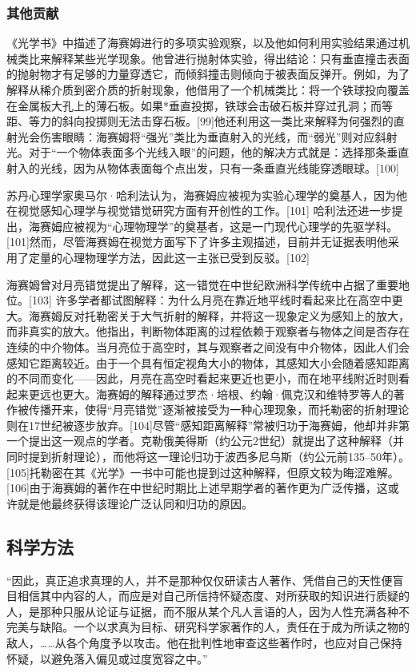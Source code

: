 \subsubsection{其他贡献}
《光学书》中描述了海赛姆进行的多项实验观察，以及他如何利用实验结果通过机械类比来解释某些光学现象。他曾进行抛射体实验，得出结论：只有垂直撞击表面的抛射物才有足够的力量穿透它，而倾斜撞击则倾向于被表面反弹开。例如，为了解释从稀介质到密介质的折射现象，他借用了一个机械类比：将一个铁球投向覆盖在金属板大孔上的薄石板。如果*垂直投掷，铁球会击破石板并穿过孔洞；而等距、等力的斜向投掷则无法击穿石板。[99]他还利用这一类比来解释为何强烈的直射光会伤害眼睛：海赛姆将“强光”类比为垂直射入的光线，而“弱光”则对应斜射光。对于“一个物体表面多个光线入眼”的问题，他的解决方式就是：选择那条垂直射入的光线，因为从物体表面每个点出发，只有一条垂直光线能穿透眼球。[100]

苏丹心理学家奥马尔·哈利法认为，海赛姆应被视为实验心理学的奠基人，因为他在视觉感知心理学与视觉错觉研究方面有开创性的工作。[101]
哈利法还进一步提出，海赛姆应被视为“心理物理学”的奠基者，这是一门现代心理学的先驱学科。[101]然而，尽管海赛姆在视觉方面写下了许多主观描述，目前并无证据表明他采用了定量的心理物理学方法，因此这一主张已受到反驳。[102]

海赛姆曾对月亮错觉提出了解释，这一错觉在中世纪欧洲科学传统中占据了重要地位。[103]
许多学者都试图解释：为什么月亮在靠近地平线时看起来比在高空中更大。海赛姆反对托勒密关于大气折射的解释，并将这一现象定义为感知上的放大，而非真实的放大。他指出，判断物体距离的过程依赖于观察者与物体之间是否存在连续的中介物体。当月亮位于高空时，其与观察者之间没有中介物体，因此人们会感知它距离较近。由于一个具有恒定视角大小的物体，其感知大小会随着感知距离的不同而变化——因此，月亮在高空时看起来更近也更小，而在地平线附近时则看起来更远也更大。海赛姆的解释通过罗杰·培根、约翰·佩克汉和维特罗等人的著作被传播开来，使得“月亮错觉”逐渐被接受为一种心理现象，而托勒密的折射理论则在17世纪被逐步放弃。[104]尽管“感知距离解释”常被归功于海赛姆，他却并非第一个提出这一观点的学者。克勒俄美得斯（约公元2世纪）就提出了这种解释（并同时提到折射理论），而他将这一理论归功于波西多尼乌斯（约公元前135–50年）。[105]托勒密在其《光学》一书中可能也提到过这种解释，但原文较为晦涩难解。[106]由于海赛姆的著作在中世纪时期比上述早期学者的著作更为广泛传播，这或许就是他最终获得该理论广泛认同和归功的原因。
\subsection{科学方法}
“因此，真正追求真理的人，并不是那种仅仅研读古人著作、凭借自己的天性便盲目相信其中内容的人，而应是对自己所信持怀疑态度、对所获取的知识进行质疑的人，是那种只服从论证与证据，而不服从某个凡人言语的人，因为人性充满各种不完美与缺陷。一个以求真为目标、研究科学家著作的人，责任在于成为所读之物的敌人，……从各个角度予以攻击。他在批判性地审查这些著作时，也应对自己保持怀疑，以避免落入偏见或过度宽容之中。”

